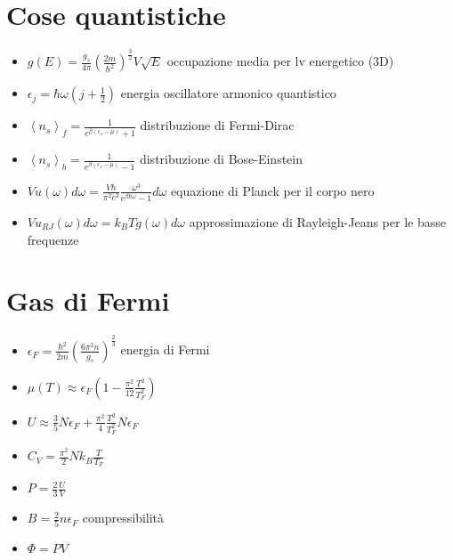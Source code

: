 \documentclass[a4paper]{article}
\begin{document}
    \section{Cose quantistiche}
        \begin{itemize}
            \item $g(E)=\frac{g_s}{4\pi}\left(\frac{2m}{\hbar^2}\right)^{\frac{3}{2}}V\sqrt{E}$ occupazione media per lv energetico (3D)
            \item $\epsilon_j=\hbar\omega\left(j+\frac{1}{2}\right)$ energia oscillatore armonico quantistico
            \item $\left\langle n_s \right\rangle_f=\frac{1}{e^{\beta(\epsilon_s-\mu)}+1}$ distribuzione di Fermi-Dirac
            \item $\left\langle n_s \right\rangle_b=\frac{1}{e^{\beta(\epsilon_s-\mu)}-1}$ distribuzione di Bose-Einstein
            \item $Vu(\omega)d\omega=\frac{V\hbar}{\pi^2c^3}\frac{\omega^3}{e^{\beta\hbar\omega}-1}d\omega$ equazione di Planck per il corpo nero
            \item $Vu_{RJ}(\omega)d\omega=k_BTg(\omega)d\omega$ approssimazione di Rayleigh-Jeans per le basse frequenze
        \end{itemize}

    \section{Gas di Fermi}
        \begin{itemize}
            \item $\epsilon_F=\frac{\hbar^2}{2m}\left(\frac{6\pi^2n}{g_s}\right)^{\frac{2}{3}}$ energia di Fermi
            \item $\mu(T)\approx\epsilon_F\left(1-\frac{\pi^2}{12}\frac{T^2}{T_F^2}\right)$
            \item $U\approx\frac{3}{5}N\epsilon_F+\frac{\pi^2}{4}\frac{T^2}{T_F^2}N\epsilon_F$
            \item $C_V=\frac{\pi^2}{2}Nk_B\frac{T}{T_F}$
            \item $P=\frac{2}{3}\frac{U}{V}$
            \item $B=\frac{2}{5}n\epsilon_F$ compressibilità
            \item $\Phi=PV$
        \end{itemize}
\end{document}
